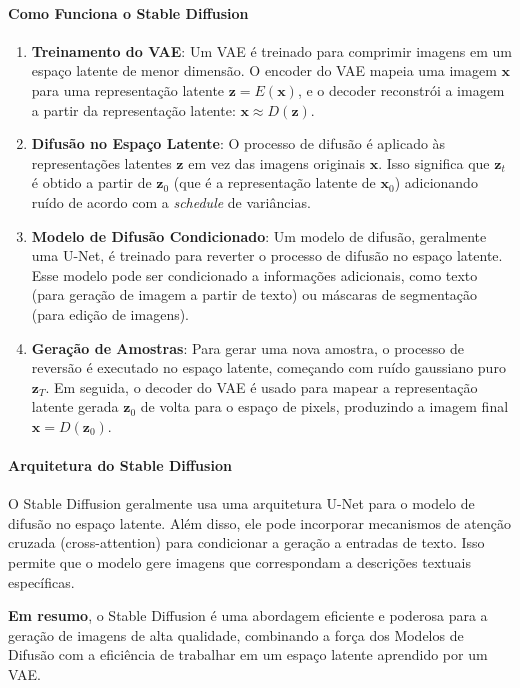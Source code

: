 \documentclass[a4paper]{tufte-handout}
\begin{document}
\paragraph{Como Funciona o Stable Diffusion}

\begin{enumerate}
    \item \textbf{Treinamento do VAE}: Um VAE é treinado para comprimir imagens em um espaço latente de menor dimensão. O encoder do VAE mapeia uma imagem $\mathbf{x}$ para uma representação latente $\mathbf{z} = E(\mathbf{x})$, e o decoder reconstrói a imagem a partir da representação latente: $\mathbf{x} \approx D(\mathbf{z})$.
    \item \textbf{Difusão no Espaço Latente}: O processo de difusão é aplicado às representações latentes $\mathbf{z}$ em vez das imagens originais $\mathbf{x}$. Isso significa que $\mathbf{z}_t$ é obtido a partir de $\mathbf{z}_0$ (que é a representação latente de $\mathbf{x}_0$) adicionando ruído de acordo com a \textit{schedule} de variâncias.
    \item \textbf{Modelo de Difusão Condicionado}: Um modelo de difusão, geralmente uma U-Net, é treinado para reverter o processo de difusão no espaço latente. Esse modelo pode ser condicionado a informações adicionais, como texto (para geração de imagem a partir de texto) ou máscaras de segmentação (para edição de imagens).
    \item \textbf{Geração de Amostras}: Para gerar uma nova amostra, o processo de reversão é executado no espaço latente, começando com ruído gaussiano puro $\mathbf{z}_T$. Em seguida, o decoder do VAE é usado para mapear a representação latente gerada $\mathbf{z}_0$ de volta para o espaço de pixels, produzindo a imagem final $\mathbf{x} = D(\mathbf{z}_0)$.
\end{enumerate}

\paragraph{Arquitetura do Stable Diffusion}

O Stable Diffusion geralmente usa uma arquitetura U-Net para o modelo de difusão no espaço latente. Além disso, ele pode incorporar mecanismos de atenção cruzada (cross-attention) para condicionar a geração a entradas de texto. Isso permite que o modelo gere imagens que correspondam a descrições textuais específicas.

\textbf{Em resumo}, o Stable Diffusion é uma abordagem eficiente e poderosa para a geração de imagens de alta qualidade, combinando a força dos Modelos de Difusão com a eficiência de trabalhar em um espaço latente aprendido por um VAE.
\end{document}
